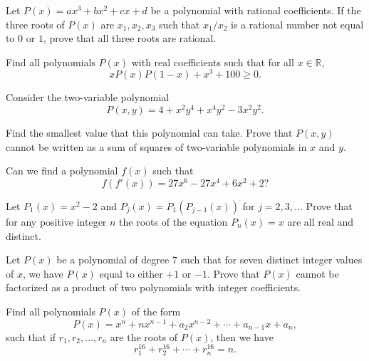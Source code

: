\begin{question}[name={1997 Iran}]
    Let $P(x)=ax^3+bx^2+cx+d$ be a polynomial with rational coefficients. If the three roots of $P(x)$ are $x_1,x_2,x_3$ such that $x_1/x_2$ is a rational number not equal to $0$ or $1$, prove that all three roots are rational.
\end{question}


\begin{question}[name={1997 Iran}]
    Find all polynomials $P(x)$ with real coefficients such that for all $x \in \mathbb R$,
    \[xP(x)P(1-x) + x^3 + 100 \geq 0.\]
\end{question}

\begin{question}[name={1981 USSR}]
    Consider the two-variable polynomial
    \[P(x,y) = 4 + x^2y^4 + x^4y^2 - 3x^2y^2.\]
    \begin{tasks}
        \task Find the smallest value that this polynomial can take.
        \task Prove that $P(x,y)$ cannot be written as a sum of squares of two-variable polynomials in $x$ and $y$.
    \end{tasks}
\end{question}


\begin{question}
    Can we find a polynomial $f(x)$ such that
    \[f(f'(x)) = 27x^6 - 27x^4 + 6x^2 + 2?\]
\end{question}

\begin{question}[name={1976 International Mathematics Olympiad}]
    Let $P_{1}(x)=x^{2}-2$ and $P_{j}(x)=P_{1}(P_{j-1}(x))$ for $j=2,3,\dots$ Prove that for any positive integer $n$ the roots of the equation $P_{n}(x)=x$ are all real and distinct.
\end{question}


\begin{question}
    Let $P(x)$ be a polynomial of degree $7$ such that for seven distinct integer values of $x$, we have $P(x)$ equal to either $+1$ or $-1$. Prove that $P(x)$ cannot be factorized as a product of two polynomials with integer coefficients.
\end{question}


\begin{question}
    Find all polynomials $P(x)$ of the form
    \[P(x) = x^n + nx^{n-1} + a_2x^{n-2} + \cdots + a_{n-1}x + a_n,\]
    such that if $r_1,r_2,\dots,r_n$ are the roots of $P(x)$, then we have
    \[r_1^{16} + r_2^{16} + \cdots + r_n^{16}=n.\]
\end{question}



